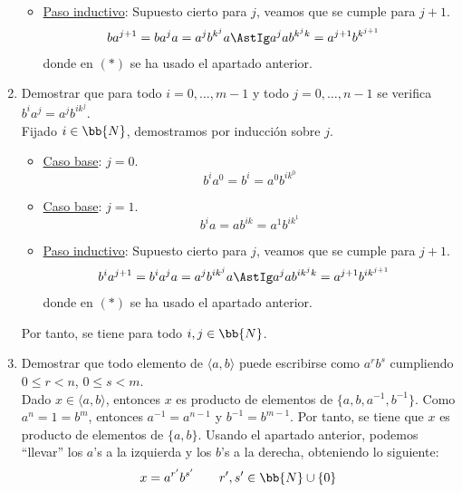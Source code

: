 \begin{ejercicio}
\begin{enumerate}
\begin{itemize}
            \item \ul{Paso inductivo}: Supuesto cierto para $j$, veamos que se cumple para $j+1$.
            \begin{align*}
                ba^{j+1}
                &= ba^ja = a^jb^{k^j}a \AstIg a^jab^{k^jk}
                = a^{j+1}b^{k^{j+1}}
            \end{align*}
            donde en $(\ast)$ se ha usado el apartado anterior.
        \end{itemize}
        \item Demostrar que para todo $i = 0, \ldots, m - 1$ y todo $j = 0, \ldots, n - 1$ se verifica $b^ia^j = a^jb^{ik^j}$.\\
        Fijado $i\in \bb{N}$, demostramos por inducción sobre $j$.
        \begin{itemize}
            \item  \ul{Caso base}: $j = 0$.
            \begin{equation*}
                b^ia^0 = b^i = a^0b^{ik^0}
            \end{equation*}

            \item \ul{Caso base}: $j = 1$.
            \begin{equation*}
                b^ia = ab^{ik} = a^1b^{ik^1}
            \end{equation*}

            \item \ul{Paso inductivo}: Supuesto cierto para $j$, veamos que se cumple para $j+1$.
            \begin{align*}
                b^ia^{j+1}
                &= b^ia^ja = a^jb^{ik^j}a \AstIg a^jab^{ik^jk}
                = a^{j+1}b^{ik^{j+1}}
            \end{align*}
            donde en $(\ast)$ se ha usado el apartado anterior.
        \end{itemize}
        Por tanto, se tiene para todo $i, j\in \bb{N}$.
        \item Demostrar que todo elemento de $\langle a, b \rangle$ puede escribirse como $a^rb^s$ cumpliendo $0 \leq r < n$, $0 \leq s < m$.\\
        
        Dado $x\in \langle a, b \rangle$, entonces $x$ es producto de elementos de $\{a,b,a^{-1},b^{-1}\}$. Como $a^n = 1 = b^m$, entonces $a^{-1} = a^{n-1}$ y $b^{-1} = b^{m-1}$. Por tanto, se tiene que $x$ es producto de elementos de $\{a, b\}$. Usando el apartado anterior, podemos ``llevar'' los $a$'s a la izquierda y los $b$'s a la derecha, obteniendo lo siguiente:
        \begin{equation*}
            x = a^{r'}b^{s'}\qquad r', s'\in \bb{N}\cup \{0\}
        \end{equation*}


\end{enumerate}
\end{ejercicio}
